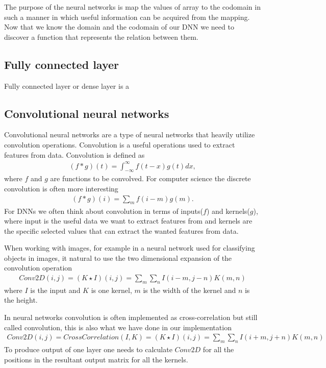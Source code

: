 \documentclass[12pt,a4paper,english
]{tunithesis}
\begin{document}
The purpose of the neural networks is map the values of array to the codomain in such a manner in which useful information can be acquired from the mapping.
Now that we know the domain and the codomain of our DNN we need to discover a function that represents the relation between them.

\subsection{Fully connected layer}
Fully connected layer or dense layer is a

\subsection{Convolutional neural networks}
Convolutional neural networks are a type of neural networks that heavily utilize convolution operations. Convolution is a useful operations used to extract features from data.
Convolution is defined as
\begin{align}
  (f \ast g)(t) = \int_{-\infty}^{\infty}f(t-x)g(t)dx,
\end{align}
where $f$ and $g$ are functions to be convolved. For computer science the discrete convolution is often more interesting
\begin{align}
  (f \ast g)(i) = \sum_{m}f(i-m)g(m).
\end{align}
For DNNs we often think about convolution in terms of inputs($f$) and kernels($g$), where input is the useful data we want to extract features from and kernels are the specific selected values that can extract the wanted features from data.

When working with images, for example in a neural network used for classifying objects in images, it  natural to use the two dimensional expansion of the convolution operation
\begin{align}
  Conv2D(i, j) = (K \star I)(i,j) = \sum_{m}\sum_{n}I(i-m,j-n)K(m, n)
\end{align}
where $I$ is the input and $K$ is one kernel, $m$ is the width of the kernel and $n$ is the height.

In neural networks convolution is often implemented as cross-correlation but still called convolution, this is also what we have done in our implementation
\begin{align}
  Conv2D(i,j) = CrossCorrelation(I, K) = (K \star I)(i,j) = \sum_{m}\sum_{n}I(i+m,j+n)K(m, n)
\end{align}
To produce output of one layer one needs to calculate $Conv2D$ for all the positions in the resultant output matrix for all the kernels.
\end{document}
